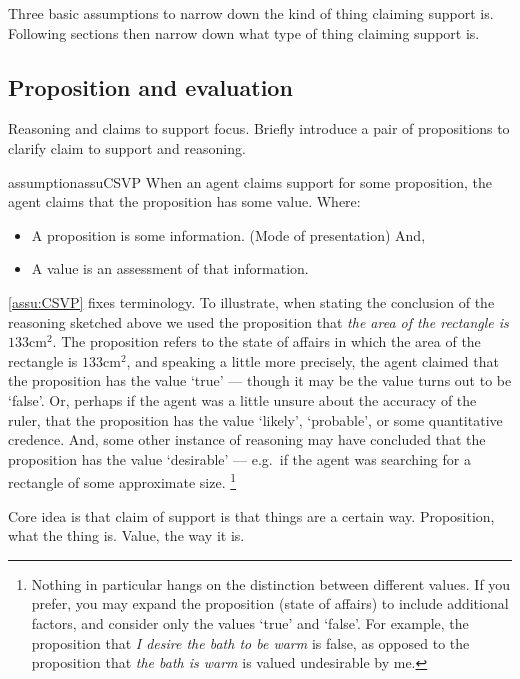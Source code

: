 \begin{note}
  Three basic assumptions to narrow down the kind of thing claiming support is.
  Following sections then narrow down what type of thing claiming support is.
\end{note}

\subsection{Proposition and evaluation}

\begin{note}
  Reasoning and claims to support focus.
  Briefly introduce a pair of propositions to clarify claim to support and reasoning.

  \begin{restatable}{assumption}{assuCSVP}\label{assu:CSVP}
    When an agent claims support for some proposition, the agent claims that the proposition has some value.
    Where:
    \begin{itemize}
    \item A proposition is some information. (Mode of presentation) And,
    \item A value is an assessment of that information.
    \end{itemize}
    \vspace{-\baselineskip}
  \end{restatable}
  \autoref{assu:CSVP} fixes terminology.
  To illustrate, when stating the conclusion of the reasoning sketched above we used the proposition that \emph{the area of the rectangle is \(133\text{cm}^{2}\)}.
  The proposition refers to the state of affairs in which the area of the rectangle is \(133\text{cm}^{2}\), and speaking a little more precisely, the agent claimed that the proposition has the value `true' --- though it may be the value turns out to be `false'.
  Or, perhaps if the agent was a little unsure about the accuracy of the ruler, that the proposition has the value `likely', `probable', or some quantitative credence.
  And, some other instance of reasoning may have concluded that the proposition has the value `desirable' --- e.g.\ if the agent was searching for a rectangle of some approximate size.\nolinebreak
  \footnote{
    Nothing in particular hangs on the distinction between different values.
    If you prefer, you may expand the proposition (state of affairs) to include additional factors, and consider only the values `true' and `false'.
    For example, the proposition that \emph{I desire the bath to be warm} is false, as opposed to the proposition that \emph{the bath is warm} is valued undesirable by me.
  }

  Core idea is that claim of support is that things are a certain way.
  Proposition, what the thing is.
  Value, the way it is.
\end{note}


